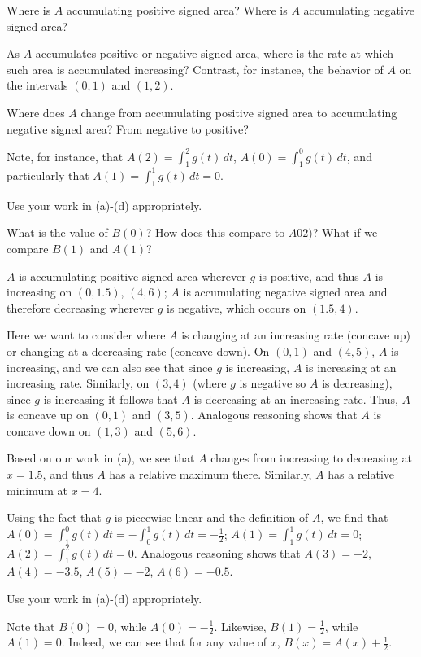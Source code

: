 \begin{bighint}
 \ba
	\item Where is $A$ accumulating positive signed area? Where is $A$ accumulating negative signed area?
	\item As $A$ accumulates positive or negative signed area, where is the rate at which such area is accumulated increasing?  Contrast, for instance, the behavior of $A$ on the intervals $(0,1)$ and $(1,2)$.
	\item Where does $A$ change from accumulating positive signed area to accumulating negative signed area?  From negative to positive?
	\item Note, for instance, that $A(2) = \int_1^2 g(t) \, dt$, $A(0) = \int_1^0 g(t) \, dt$, and particularly that $A(1) = \int_1^1 g(t) \, dt = 0$.
	\item Use your work in (a)-(d) appropriately.
	\item What is the value of $B(0)$?  How does this compare to $A02)$?  What if we compare $B(1)$ and $A(1)$?
\ea
\end{bighint}
\begin{activitySolution}
\ba
	\item $A$ is accumulating positive signed area wherever $g$ is positive, and thus $A$ is increasing on $(0,1.5)$, $(4,6)$;  $A$ is accumulating negative signed area and therefore decreasing wherever $g$ is negative, which occurs on $(1.5,4)$.
	\item Here we want to consider where $A$ is changing at an increasing rate (concave up) or changing at a decreasing rate (concave down).  On $(0,1)$ and $(4,5)$, $A$ is increasing, and we can also see that since $g$ is increasing, $A$ is increasing at an increasing rate.  Similarly, on $(3,4)$ (where $g$ is negative so $A$ is decreasing), since $g$ is increasing it follows that $A$ is decreasing at an increasing rate.  Thus, $A$ is concave up on $(0,1)$ and $(3,5)$.  Analogous reasoning shows that $A$ is concave down on $(1,3)$ and $(5,6)$.
	\item Based on our work in (a), we see that $A$ changes from increasing to decreasing at $x = 1.5$, and thus $A$ has a relative maximum there.  Similarly, $A$ has a relative minimum at $x = 4$.
	\item Using the fact that $g$ is piecewise linear and the definition of $A$, we find that $A(0) = \int_1^0 g(t) \, dt = -\int_0^1 g(t) \, dt = -\frac{1}{2}$; $A(1) = \int_1^1 g(t) \, dt = 0$; $A(2) = \int_1^2 g(t) \, dt = 0$.  Analogous reasoning shows that $A(3) = -2$, $A(4) = -3.5$, $A(5) = -2$, $A(6) = -0.5$.
	\item Use your work in (a)-(d) appropriately.
	\item Note that $B(0) = 0$, while $A(0) = -\frac{1}{2}$.  Likewise, $B(1) = \frac{1}{2}$, while $A(1) = 0$.  Indeed, we can see that for any value of $x$, $B(x) = A(x) + \frac{1}{2}$.
\ea
\end{activitySolution}
\aftera